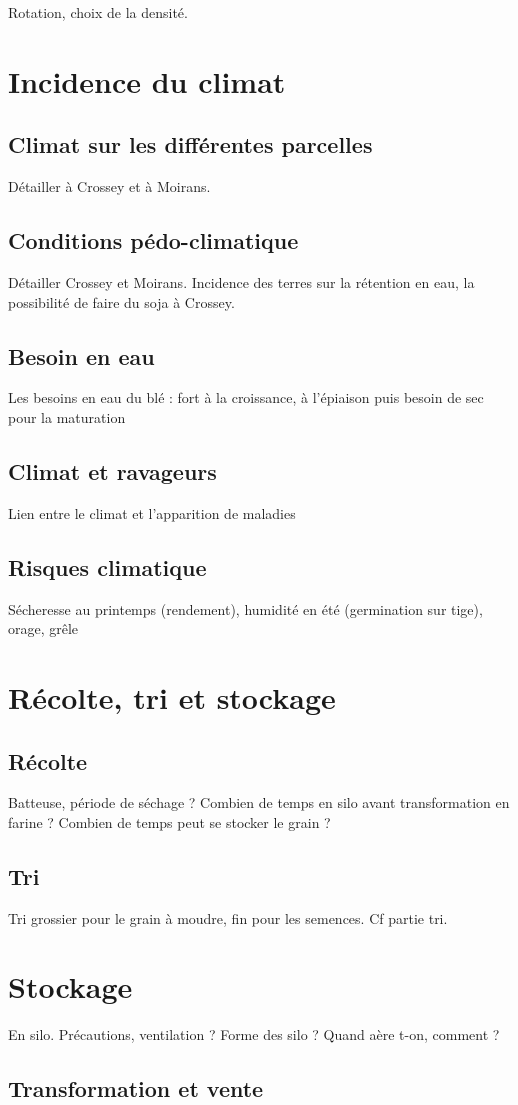 \documentclass{article}
\begin{document}
Rotation, choix de la densité. 

\section{Incidence du climat}

\subsection{Climat sur les différentes parcelles}

Détailler à Crossey et à Moirans. 

\subsection{Conditions pédo-climatique}

Détailler Crossey et Moirans. Incidence des terres sur la rétention en eau, la possibilité de faire du soja à Crossey.

\subsection{Besoin en eau}

Les besoins en eau du blé : fort à la croissance, à l'épiaison puis besoin de sec pour la maturation

\subsection{Climat et ravageurs}

Lien entre le climat et l'apparition de maladies

\subsection{Risques climatique}

Sécheresse au printemps (rendement), humidité en été (germination sur tige), orage, grêle

\section{Récolte, tri et stockage}

\subsection{Récolte}

Batteuse, période de séchage ? Combien de temps en silo avant transformation en farine ? Combien de temps peut se stocker le grain ?

\subsection{Tri}

Tri grossier pour le grain à moudre, fin pour les semences. Cf partie tri.

\section{Stockage}

En silo. Précautions, ventilation ? Forme des silo ? Quand aère t-on, comment ? 

\subsection{Transformation et vente}
\end{document}
